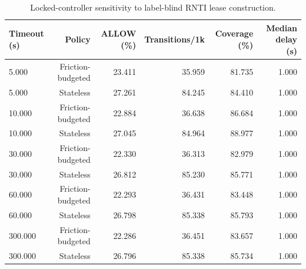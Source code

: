 \begin{table}[t]
\centering
\scriptsize
\caption{Locked-controller sensitivity to label-blind RNTI lease construction.}
\label{tab:lease-timeout}
\begin{tabular}{lrrrrr}
\hline
Timeout (s) & Policy & ALLOW (\%) & Transitions/1k & Coverage (\%) & Median delay (s) \\
\hline
5.000 & Friction-budgeted & 23.411 & 35.959 & 81.735 & 1.000 \\
5.000 & Stateless & 27.261 & 84.245 & 84.410 & 1.000 \\
10.000 & Friction-budgeted & 22.884 & 36.638 & 86.684 & 1.000 \\
10.000 & Stateless & 27.045 & 84.964 & 88.977 & 1.000 \\
30.000 & Friction-budgeted & 22.330 & 36.313 & 82.979 & 1.000 \\
30.000 & Stateless & 26.812 & 85.230 & 85.771 & 1.000 \\
60.000 & Friction-budgeted & 22.293 & 36.431 & 83.448 & 1.000 \\
60.000 & Stateless & 26.798 & 85.338 & 85.793 & 1.000 \\
300.000 & Friction-budgeted & 22.286 & 36.451 & 83.657 & 1.000 \\
300.000 & Stateless & 26.796 & 85.338 & 85.734 & 1.000 \\
\hline
\end{tabular}
\end{table}
